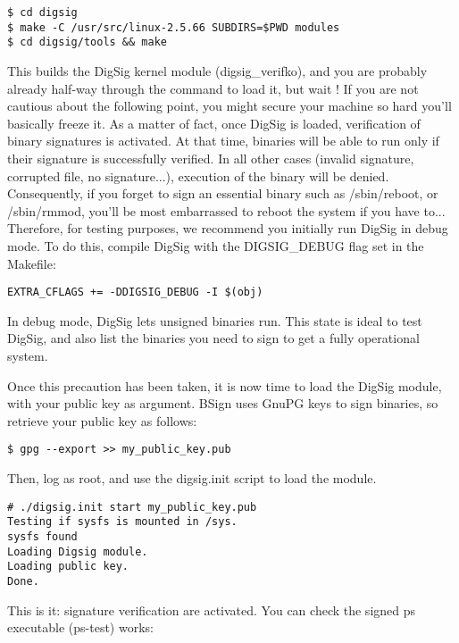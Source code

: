 \documentclass{article}
\begin{document}
\small
\begin{verbatim} 
$ cd digsig
$ make -C /usr/src/linux-2.5.66 SUBDIRS=$PWD modules
$ cd digsig/tools && make
\end{verbatim} 
\normalsize

This builds the DigSig kernel module (digsig\_verifko), and you are
probably already half-way through the command to load it, but wait !
If you are not cautious about the following point, you might secure
your machine so hard you'll basically freeze it. As a matter of fact,
once DigSig is loaded, verification of binary signatures is activated.
At that time, binaries will be able to run only if their signature is
successfully verified. In all other cases (invalid signature,
corrupted file, no signature...), execution of the binary will be
denied. Consequently, if you forget to sign an essential binary such
as /sbin/reboot, or /sbin/rmmod, you'll be most embarrassed to reboot
the system if you have to...  Therefore, for testing purposes, we
recommend you initially run DigSig in debug mode. To do this, compile
DigSig with the DIGSIG\_DEBUG flag set in the
Makefile:

\small
\begin{verbatim} 
EXTRA_CFLAGS += -DDIGSIG_DEBUG -I $(obj)
\end{verbatim} 
\normalsize

In debug mode, DigSig lets unsigned binaries run. This state is ideal
to test DigSig, and also list the binaries you need to sign to get a
fully operational system.

Once this precaution has been taken, it is now time to load the DigSig
module, with your public key as argument. BSign uses GnuPG keys to
sign binaries, so retrieve your public key as follows:

\small
\begin{verbatim} 
$ gpg --export >> my_public_key.pub 
\end{verbatim}
\normalsize

Then, log as root, and use the digsig.init script to load the module.

\small
\begin{verbatim} 
# ./digsig.init start my_public_key.pub
Testing if sysfs is mounted in /sys.
sysfs found
Loading Digsig module.
Loading public key.
Done.
\end{verbatim} 
\normalsize

This is it: signature verification are activated. You can check the 
signed ps executable (ps-test) works:
\end{document}

